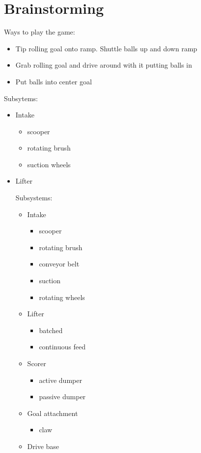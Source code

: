 \section*{Brainstorming}
Ways to play the game:
\begin{itemize}
 \item Tip rolling goal onto ramp. Shuttle balls up and down ramp
 \item Grab rolling goal and drive around with it putting balls in
 \item Put balls into center goal %
\end{itemize}
Subsytems:
\begin{itemize}
 \item Intake
 \begin{itemize}
  \item scooper
  \item rotating brush
  \item suction
  \rotating wheels
 \end{itemize}
 \item Lifter

Subsystems:
\begin{itemize}
 \item Intake
 \begin{itemize}
  \item scooper
  \item rotating brush
  \item conveyor belt
  \item suction
  \item rotating wheels
 \end{itemize}
 \item Lifter
 \begin{itemize}
  \item batched
  \item continuous feed
 \end{itemize}
 \item Scorer
 \begin{itemize}
  \item active dumper
  \item passive dumper
 \end{itemize}
 \item Goal attachment
 \begin{itemize}
  \item claw
 \end{itemize}
 \item Drive base
\end{itemize}


\end{itemize}
